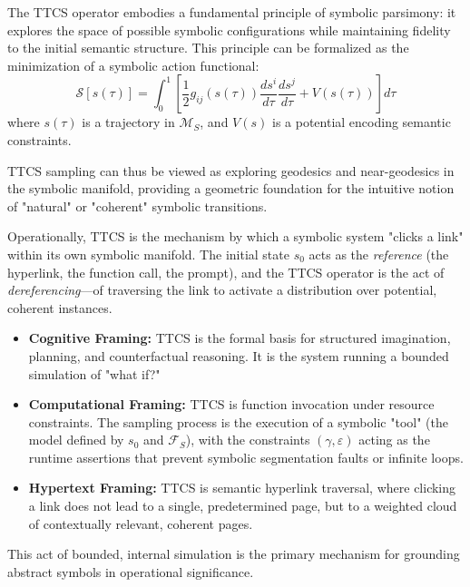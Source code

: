 \begin{scholium}
\label{scholium:bk4_symbolic_parsimony}
The TTCS operator embodies a fundamental principle of symbolic parsimony: it explores the space of possible symbolic configurations while maintaining fidelity to the initial semantic structure. This principle can be formalized as the minimization of a symbolic action functional:
\[
\mathcal{S}[s(\tau)] = \int_0^1 \left[ \frac{1}{2} g_{ij}(s(\tau)) \frac{ds^i}{d\tau} \frac{ds^j}{d\tau} + V(s(\tau)) \right] d\tau
\]
where $s(\tau)$ is a trajectory in $\mathcal{M}_S$, and $V(s)$ is a potential encoding semantic constraints.

TTCS sampling can thus be viewed as exploring geodesics and near-geodesics in the symbolic manifold, providing a geometric foundation for the intuitive notion of "natural" or "coherent" symbolic transitions.
\end{scholium}

\begin{scholium}
\label{scholium:bk4_ttcs_link_traversal}
Operationally, TTCS is the mechanism by which a symbolic system "clicks a link" within its own symbolic manifold. The initial state $s_0$ acts as the \emph{reference} (the hyperlink, the function call, the prompt), and the TTCS operator is the act of \emph{dereferencing}—of traversing the link to activate a distribution over potential, coherent instances.
\begin{itemize}
    \item \textbf{Cognitive Framing:} TTCS is the formal basis for structured imagination, planning, and counterfactual reasoning. It is the system running a bounded simulation of "what if?"
    \item \textbf{Computational Framing:} TTCS is function invocation under resource constraints. The sampling process is the execution of a symbolic "tool" (the model defined by $s_0$ and $\mathcal{F}_S$), with the constraints $(\gamma, \varepsilon)$ acting as the runtime assertions that prevent symbolic segmentation faults or infinite loops.
    \item \textbf{Hypertext Framing:} TTCS is semantic hyperlink traversal, where clicking a link does not lead to a single, predetermined page, but to a weighted cloud of contextually relevant, coherent pages.
\end{itemize}
This act of bounded, internal simulation is the primary mechanism for grounding abstract symbols in operational significance.
\end{scholium}

